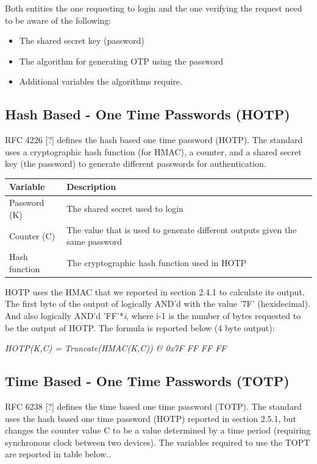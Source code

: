 \documentclass[bsc,frontabs,twoside,singlespacing,parskip,deptreport]{infthesis}     %
\begin{document}
Both entities the one requesting to login and the one verifying the request need to be aware of the following:
\begin{itemize}
\item The shared secret key (password)
\item The algorithm for generating OTP using the password
\item Additional variables the algorithms require.
\end{itemize}

\subsection{Hash Based - One Time Passwords (HOTP)}
RFC 4226 [?] defines the hash based one time password (HOTP). The standard uses a cryptographic hash function (for HMAC), a counter, and a shared secret key (the password) to generate different passwords for authentication.

\begin{table}[H]
\begin{tabular}{|l|p{10cm}|}
\hline
Variable & Description\\
\hline
Password (K) & The shared secret used to login\\
\hline
Counter (C) & The value that is used to generate different outputs given the same password\\
\hline
Hash function & The cryptographic hash function used in HOTP\\
\hline
\end{tabular}
\end{table}

HOTP uses the HMAC that we reported in section 2.4.1 to calculate its output. The first byte of the output of logically AND'd with the value '7F' (hexidecimal). And also logically AND'd 'FF'*\textit{i}, where i-1 is the number of bytes requested to be the output of HOTP. The formula is reported below (4 byte output):
\begin{center}
\textit{HOTP(K,C) = Truncate(HMAC(K,C)) \& 0x7F FF FF FF}
\end{center}

\subsection{Time Based - One Time Passwords (TOTP)}
RFC 6238 [?] defines the time based one time password (TOTP). The standard uses the hash based one time password (HOTP) reported in section 2.5.1, but changes the counter value C to be a value determined by a time period (requiring synchronous clock between two devices). The variables required to use the TOPT are reported in table below..
\end{document}
